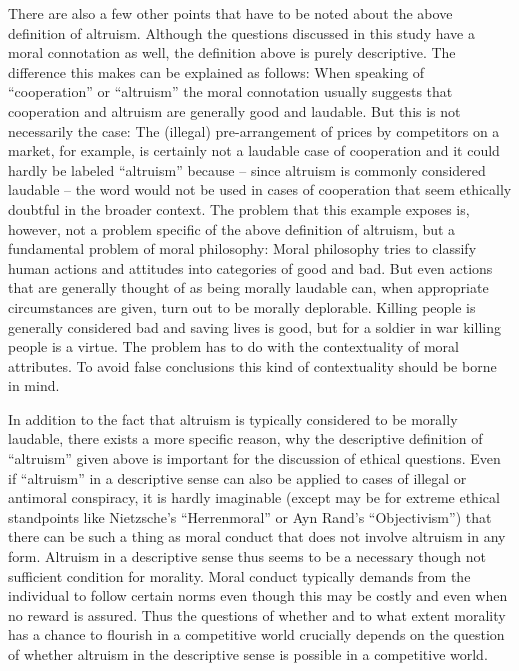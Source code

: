 There are also a few other points that have to be noted about the above
definition of altruism. Although the questions discussed in this study have a
moral connotation as well, the definition above is purely descriptive. The
difference this makes can be explained as follows: When speaking of
``cooperation'' or ``altruism'' the moral connotation usually suggests that
cooperation and altruism are generally good and laudable. But this is not
necessarily the case: The (illegal) pre-arrangement of prices by competitors
on a market, for example, is certainly not a laudable case of cooperation and
it could hardly be labeled ``altruism'' because -- since altruism is commonly
considered laudable -- the word would not be used in cases of cooperation that
seem ethically doubtful in the broader context. The problem that this example
exposes is, however, not a problem specific of the above definition of
altruism, but a fundamental problem of moral philosophy: Moral philosophy
tries to classify human actions and attitudes into categories of good and bad.
But even actions that are generally thought of as being morally laudable can,
when appropriate circumstances are given, turn out to be morally deplorable.
Killing people is generally considered bad and saving lives is good, but for a
soldier in war killing people is a virtue. The problem has to do with the
contextuality of moral attributes. To avoid false conclusions this kind of
contextuality should be borne in mind.

In addition to the fact that altruism is typically considered to be morally
laudable, there exists a more specific reason, why the descriptive definition
of ``altruism'' given above is important for the discussion of ethical
questions. Even if ``altruism'' in a descriptive sense can also be applied to
cases of illegal or antimoral conspiracy, it is hardly imaginable (except may
be for extreme ethical standpoints like Nietzsche's ``Herrenmoral'' or Ayn Rand's ``Objectivism'') that
there can be such a thing as moral conduct that does not involve altruism in
any form. Altruism in a descriptive sense thus seems to be a necessary though
not sufficient condition for morality. Moral conduct typically demands from
the individual to follow certain norms even though this may be costly and even
when no reward is assured. Thus the questions of whether and to what extent
morality has a chance to flourish in a competitive world crucially depends on
the question of whether altruism in the descriptive sense is possible in a
competitive world.

